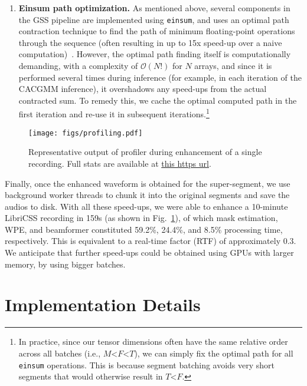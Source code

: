 \documentclass[a4paper]{article}
\begin{document}
\begin{enumerate}[wide, labelwidth=!, labelindent=0pt]
\item \textbf{Einsum path optimization.} As mentioned above, several components in the GSS pipeline are implemented using \texttt{einsum}, and uses an optimal path contraction technique to find the path of minimum floating-point operations through the sequence (often resulting in up to 15x speed-up over a naive computation)~\cite{Smith2018opteinsum}. However, the optimal path finding itself is computationally demanding, with a complexity of $\mathcal{O}(N!)$ for $N$ arrays, and since it is performed several times during inference (for example, in each iteration of the CACGMM inference), it overshadows any speed-ups from the actual contracted sum. To remedy this, we cache the optimal computed path in the first iteration and re-use it in subsequent iterations.\footnote{In practice, since our tensor dimensions often have the same relative order across all batches (i.e., $M$<$F$<$T$), we can simply fix the optimal path for all \texttt{einsum} operations. This is because segment batching avoids very short segments that would otherwise result in $T$<$F$.}
\end{enumerate}

\begin{figure}[t]
    \centering
    \texttt{[image: figs/profiling.pdf]}
    \vspace{-1em}
    \caption{Representative output of profiler during enhancement of a single recording. Full stats are available at \href{https://github.com/desh2608/gss/blob/master/test.pstats}{this https url}.}
    \label{fig:profiling}
\end{figure}

Finally, once the enhanced waveform is obtained for the super-segment, we use background worker threads to chunk it into the original segments and save the audios to disk. With all these speed-ups, we were able to enhance a 10-minute LibriCSS recording in 159s (as shown in Fig.~\ref{fig:profiling}), of which mask estimation, WPE, and beamformer constituted 59.2\%, 24.4\%, and 8.5\% processing time, respectively. This is equivalent to a real-time factor (RTF) of approximately 0.3. We anticipate that further speed-ups could be obtained using GPUs with larger memory, by using bigger batches.


\section{Implementation Details}
\label{sec:details}
\end{document}
